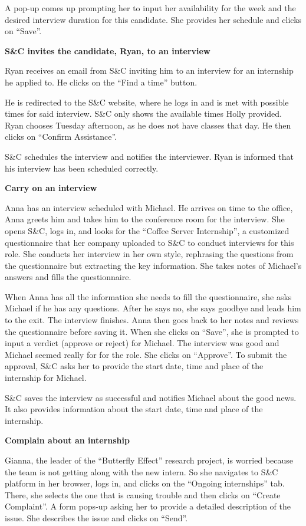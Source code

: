 A pop-up comes up prompting her to input her availability for the week and the desired interview duration for this candidate. She provides her schedule and clicks on “Save”.

 
\textbf{S\&C invites the candidate, Ryan, to an interview}

Ryan receives an email from S\&C inviting him to an interview for an internship he applied to. He clicks on the “Find a time” button. 

He is redirected to the S\&C website, where he logs in and is met with possible times for said interview. S\&C only shows the available times Holly provided. Ryan chooses Tuesday afternoon, as he does not have classes that day. He then clicks on “Confirm Assistance”.

S\&C schedules the interview and notifies the interviewer. Ryan is informed that his interview has been scheduled correctly.

\textbf{Carry on an interview}

Anna has an interview scheduled with Michael. He arrives on time to the office, Anna greets him and takes him to the conference room for the interview. She opens S\&C, logs in, and looks for the “Coffee Server Internship”, a customized questionnaire that her company uploaded to S\&C to conduct interviews for this role. She conducts her interview in her own style, rephrasing the questions from the questionnaire but extracting the key information. She takes notes of Michael’s answers and fills the questionnaire.

When Anna has all the information she needs to fill the questionnaire, she asks Michael if he has any questions. After he says no, she says goodbye and leads him to the exit. The interview finishes. Anna then goes back to her notes and reviews the questionnaire before saving it. When she clicks on “Save”, she is prompted to input a verdict (approve or reject) for Michael. The interview was good and Michael seemed really for for the role. She clicks on “Approve”. To submit the approval, S\&C asks her to provide the start date, time and place of the internship for Michael.

S\&C saves the interview as successful and notifies Michael about the good news. It also provides information about the start date, time and place of the internship.

 
    \textbf{Complain about an internship}

Gianna, the leader of the “Butterfly Effect” research project, is worried because the team is not getting along with the new intern. So she navigates to S\&C platform in her browser, logs in,  and clicks on the “Ongoing internships” tab. There, she selects the one that is causing trouble and then clicks on “Create Complaint”. A form pops-up asking her to provide a detailed description of the issue. She describes the issue and clicks on “Send”.

